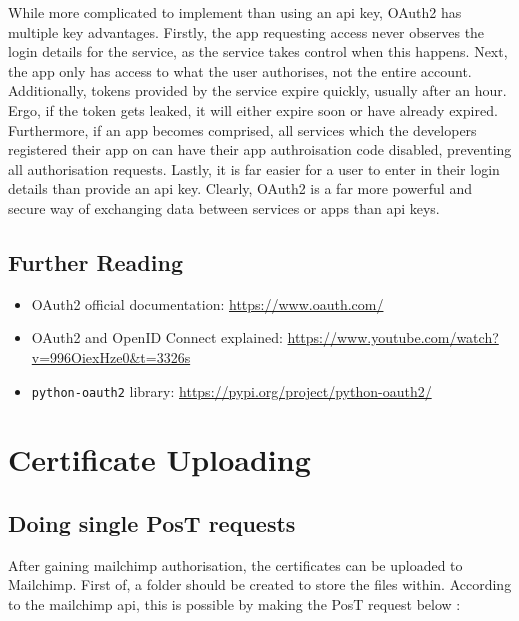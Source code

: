 \documentclass[11pt]{article}
\begin{document}
While more complicated to implement than using an \acrshort{api} key, OAuth2 has multiple key advantages. Firstly, the app \gls{request}ing access never observes the login details for the service, as the service takes control when this happens. Next, the app only has access to what the \gls{user} authorises, not the entire account. Additionally, \gls{token}s provided by the service expire quickly, usually after an hour. Ergo, if the \gls{token} gets leaked, it will either expire soon or have already expired. Furthermore, if an app becomes comprised, all services which the developers registered their app on can have their app authroisation code disabled, preventing all authorisation \gls{request}s. Lastly, it is far easier for a user to enter in their login details than provide an \acrshort{api} key. Clearly, OAuth2 is a far more powerful and secure way of exchanging data between services or apps than \acrshort{api} keys.

\subsection{Further Reading}

\begin{itemize}
    \item OAuth2 official documentation: \url{https://www.oauth.com/}
    \item OAuth2 and OpenID Connect explained: \url{https://www.youtube.com/watch?v=996OiexHze0&t=3326s}
    \item \texttt{python-oauth2} \gls{library}: \url{https://pypi.org/project/python-oauth2/}
\end{itemize}

\newpage

\section{Certificate Uploading}

\subsection{Doing single P\acrshort{os}T \gls{request}s}

After gaining \Gls{mailchimp} authorisation, the certificates can be uploaded to Mailchimp. First of, a folder should be created to store the files within. According to the \Gls{mailchimp} \acrshort{api}, this is possible by making the P\acrshort{os}T \gls{request} below \cite{mailchimp-add-folder}:
\end{document}
